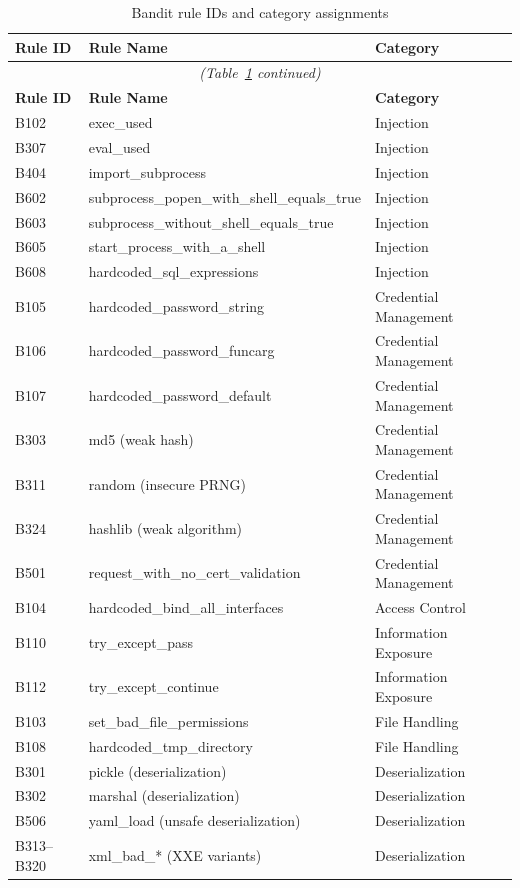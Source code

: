 \documentclass[12pt,a4paper]{report}
\begin{document}
\begin{longtable}{@{}lll@{}}
\caption{Bandit rule IDs and category assignments}
\label{tab:banditmap} \\
\toprule
\textbf{Rule ID} & \textbf{Rule Name} & \textbf{Category} \\
\midrule
\endfirsthead
\multicolumn{3}{c}{\small\itshape (Table~\ref{tab:banditmap} continued)} \\
\toprule
\textbf{Rule ID} & \textbf{Rule Name} & \textbf{Category} \\
\midrule
\endhead
\bottomrule
\endlastfoot
B102 & exec\_used                                & Injection \\
B307 & eval\_used                                & Injection \\
B404 & import\_subprocess                        & Injection \\
B602 & subprocess\_popen\_with\_shell\_equals\_true & Injection \\
B603 & subprocess\_without\_shell\_equals\_true   & Injection \\
B605 & start\_process\_with\_a\_shell            & Injection \\
B608 & hardcoded\_sql\_expressions               & Injection \\
B105 & hardcoded\_password\_string               & Credential Management \\
B106 & hardcoded\_password\_funcarg              & Credential Management \\
B107 & hardcoded\_password\_default              & Credential Management \\
B303 & md5 (weak hash)                           & Credential Management \\
B311 & random (insecure PRNG)                    & Credential Management \\
B324 & hashlib (weak algorithm)                  & Credential Management \\
B501 & request\_with\_no\_cert\_validation       & Credential Management \\
B104 & hardcoded\_bind\_all\_interfaces          & Access Control \\
B110 & try\_except\_pass                         & Information Exposure \\
B112 & try\_except\_continue                     & Information Exposure \\
B103 & set\_bad\_file\_permissions               & File Handling \\
B108 & hardcoded\_tmp\_directory                 & File Handling \\
B301 & pickle (deserialization)                  & Deserialization \\
B302 & marshal (deserialization)                 & Deserialization \\
B506 & yaml\_load (unsafe deserialization)       & Deserialization \\
B313--B320 & xml\_bad\_* (XXE variants)          & Deserialization \\
\end{longtable}

\printbibliography[heading=bibintoc,title={References}]
\end{document}
